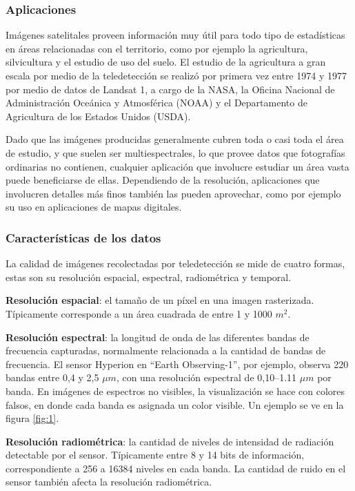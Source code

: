 \subsubsection{Aplicaciones}

Imágenes satelitales proveen información muy útil para todo tipo de estadísticas en áreas relacionadas con el
territorio, como por ejemplo la agricultura, silvicultura y el estudio de uso del suelo. El estudio de la agricultura a
gran escala por medio de la teledetección se realizó por primera vez entre 1974 y 1977 por medio de datos de Landsat 1,
a cargo de la NASA, la Oficina Nacional de Administración Oceánica y Atmosférica (NOAA) y el Departamento de
Agricultura de los Estados Unidos (USDA). \autocite{allen-usda-study}

Dado que las imágenes producidas generalmente cubren toda o casi toda el área de estudio, y que suelen ser
multiespectrales, lo que provee datos que fotografías ordinarias no contienen, cualquier aplicación que involucre
estudiar un área vasta puede beneficiarse de ellas. Dependiendo de la resolución, aplicaciones que involucren detalles
más finos también las pueden aprovechar, como por ejemplo su uso en aplicaciones de mapas digitales.

\subsubsection{Características de los datos}

La calidad de imágenes recolectadas por teledetección se mide de cuatro formas, estas son su resolución espacial,
espectral, radiométrica y temporal.

{\bf Resolución espacial}: el tamaño de un píxel en una imagen rasterizada. Típicamente corresponde a un área cuadrada
de entre 1 y 1000 $m^2$.

{\bf Resolución espectral}: la longitud de onda de las diferentes bandas de frecuencia capturadas, normalmente
relacionada a la cantidad de bandas de frecuencia. El sensor Hyperion en \enquote{Earth Observing-1}, por ejemplo,
observa 220 bandas entre 0,4 y 2,5 $\mu m$, con una resolución espectral de 0,10--1.11 $\mu m$ por
banda. \autocite{earth-observatory-earth-observing-1} En imágenes de espectros no visibles, la visualización se hace
con colores falsos, en donde cada banda es asignada un color visible. Un ejemplo se ve en la figura \ref{fig:1}.

{\bf Resolución radiométrica}: la cantidad de niveles de intensidad de radiación detectable por el sensor. Típicamente
entre 8 y 14 bits de información, correspondiente a 256 a 16384 niveles en cada banda. La cantidad de ruido en el
sensor también afecta la resolución radiométrica.

